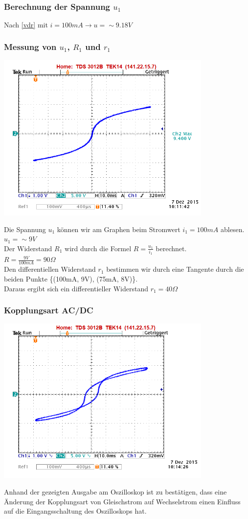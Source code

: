 \documentclass[11pt,a4paper,titlepage]{article}
\begin{document}
\subsubsection{Berechnung der Spannung $u_1$}
Nach \eqref{vdr} mit $i = 100mA \to u = \sim9.18V$
\subsubsection{Messung von $u_1$, $R_1$ und $r_1$} 
\begin{center}
\includegraphics[width=0.8\textwidth]{5_2_1}
\end{center}
Die Spannung $u_1$ k\"onnen wir am Graphen beim Stromwert $i_1 = 100mA$ ablesen. \\[1ex]
$u_1 = \sim 9V$ \\[1ex]
Der Widerstand $R_1$ wird durch die Formel $R=\frac{u_1}{i_1}$ berechnet. \\[1ex]
$R=\frac{9V}{100mA}=90\Omega$ \\[1ex]
Den differentiellen Widerstand $r_1$ bestimmen wir durch eine Tangente durch die beiden Punkte \{(100mA, 9V), (75mA, 8V)\}. \\[1ex]
Daraus ergibt sich ein differentieller Widerstand $r_1 = 40\Omega$
\newpage
\subsubsection{Kopplungsart AC/DC}
\begin{center}
\includegraphics[width=0.8\textwidth]{5_2_2}
\end{center}
Anhand der gezeigten Ausgabe am Oszilloskop ist zu best\"atigen, dass eine \"Anderung der Kopplungsart von Gleischstrom auf Wechselstrom einen Einfluss auf die Eingangsschaltung des Oszilloskops hat.
\end{document}
